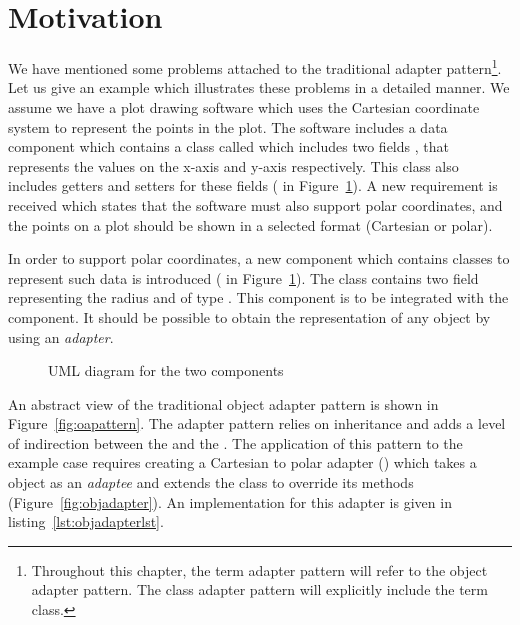 \section{Motivation}
\label{sec:adapter:motiv}

We have mentioned some problems attached to the traditional adapter pattern\footnote{Throughout this chapter, the term adapter pattern will refer to the object adapter pattern. The class adapter pattern will explicitly include the term class.}. Let us give an example which illustrates these problems in a detailed manner. 
We assume we have a plot drawing software which uses the Cartesian coordinate system to represent the points in the plot. 
The software includes a data component which contains a class called  which includes two fields , that represents the values on the x-axis and y-axis respectively. 
This class also includes getters and setters for these fields ( in Figure~\ref{fig:components}).
A new requirement is received which states that the software must also support polar coordinates, and the points on a plot should be shown in a selected format (Cartesian or polar). 

In order to support polar coordinates, a new component which contains classes to represent such data is introduced ( in Figure~\ref{fig:components}). The class  contains two field  representing the radius and  of type . This component is to be integrated with the  component. It should be possible to obtain the  representation of any  object by using an \emph{adapter}.

\begin{figure}
\centering

\label{fig:components}
\caption{UML diagram for the two components}
\end{figure}

An abstract view of the traditional object adapter pattern is shown in Figure~\ref{fig:oapattern}. The adapter pattern relies on inheritance and adds a level of indirection between the  and the . The application of this pattern to the example case requires creating a Cartesian to polar adapter () which takes a  object as an \emph{adaptee} and extends the  class to override its methods (Figure~\ref{fig:objadapter}). An implementation for this adapter is given in listing~\ref{lst:objadapterlst}.


